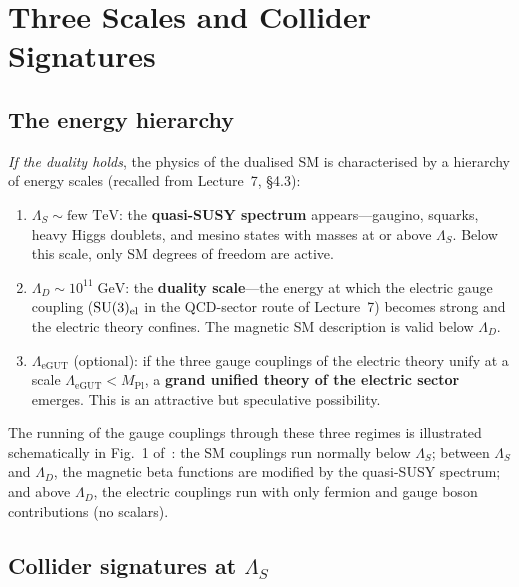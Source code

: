 \documentclass[11pt,a4paper]{article}
\begin{document}
\section{Three Scales and Collider Signatures}
\label{sec:collider}

\subsection{The energy hierarchy}

\emph{If the duality holds}, the physics of the dualised SM is
characterised by a hierarchy of energy scales (recalled from Lecture~7,
\S4.3):
\begin{enumerate}
  \item $\Lambda_S \sim \text{few TeV}$: the \textbf{quasi-SUSY
    spectrum} appears---gaugino, squarks, heavy Higgs doublets, and
    mesino states with masses at or above $\Lambda_S$.  Below this
    scale, only SM degrees of freedom are active.
  \item $\Lambda_D \sim 10^{11}\;\text{GeV}$: the \textbf{duality
    scale}---the energy at which the electric gauge coupling
    ($\mathrm{SU}(3)_{\mathrm{el}}$ in the QCD-sector route of Lecture~7)
    becomes strong and the electric theory confines.  The magnetic SM
    description is valid below $\Lambda_D$.
  \item $\Lambda_{\text{eGUT}}$ (optional): if the three gauge
    couplings of the electric theory unify at a scale
    $\Lambda_{\text{eGUT}} < M_{\text{Pl}}$, a \textbf{grand unified
    theory of the electric sector} emerges.  This is an attractive but
    speculative possibility.
\end{enumerate}
The running of the gauge couplings through these three regimes is
illustrated schematically in Fig.~1 of~\cite{CacciapagliaSannino2024}:
the SM couplings run normally below $\Lambda_S$; between $\Lambda_S$
and $\Lambda_D$, the magnetic beta functions are modified by the
quasi-SUSY spectrum; and above $\Lambda_D$, the electric couplings run
with only fermion and gauge boson contributions (no scalars).

\subsection{Collider signatures at $\Lambda_S$}
\end{document}
